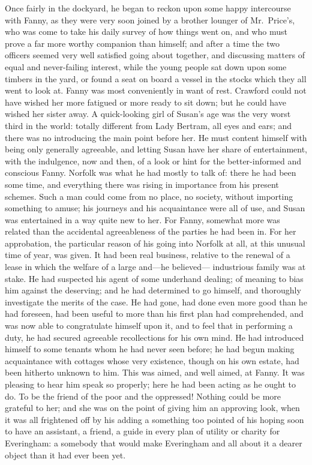 \documentclass{article}
\begin{document}
Once fairly in the dockyard, he began to reckon upon
some happy intercourse with Fanny, as they were very soon
joined by a brother lounger of Mr.\ Price's, who was come
to take his daily survey of how things went on, and who
must prove a far more worthy companion than himself;
and after a time the two officers seemed very well satisfied
going about together, and discussing matters of equal
and never-failing interest, while the young people sat down
upon some timbers in the yard, or found a seat on board
a vessel in the stocks which they all went to look at.
Fanny was most conveniently in want of rest.  Crawford could
not have wished her more fatigued or more ready to sit down;
but he could have wished her sister away.  A quick-looking
girl of Susan's age was the very worst third in the world:
totally different from Lady Bertram, all eyes and ears;
and there was no introducing the main point before her.
He must content himself with being only generally agreeable,
and letting Susan have her share of entertainment,
with the indulgence, now and then, of a look or hint
for the better-informed and conscious Fanny.  Norfolk was
what he had mostly to talk of:  there he had been some time,
and everything there was rising in importance from his
present schemes.  Such a man could come from no place,
no society, without importing something to amuse;
his journeys and his acquaintance were all of use,
and Susan was entertained in a way quite new to her.
For Fanny, somewhat more was related than the accidental
agreeableness of the parties he had been in.
For her approbation, the particular reason of his going into
Norfolk at all, at this unusual time of year, was given.
It had been real business, relative to the renewal of a
lease in which the welfare of a large and---he believed---%
industrious family was at stake.  He had suspected his
agent of some underhand dealing; of meaning to bias him
against the deserving; and he had determined to go himself,
and thoroughly investigate the merits of the case.
He had gone, had done even more good than he had foreseen,
had been useful to more than his first plan had comprehended,
and was now able to congratulate himself upon it, and to
feel that in performing a duty, he had secured agreeable
recollections for his own mind.  He had introduced himself
to some tenants whom he had never seen before; he had begun
making acquaintance with cottages whose very existence,
though on his own estate, had been hitherto unknown to him.
This was aimed, and well aimed, at Fanny.  It was pleasing
to hear him speak so properly; here he had been acting
as he ought to do.  To be the friend of the poor and
the oppressed!  Nothing could be more grateful to her;
and she was on the point of giving him an approving look,
when it was all frightened off by his adding a something
too pointed of his hoping soon to have an assistant,
a friend, a guide in every plan of utility or charity
for Everingham:  a somebody that would make Everingham
and all about it a dearer object than it had ever been
yet.
\end{document}

